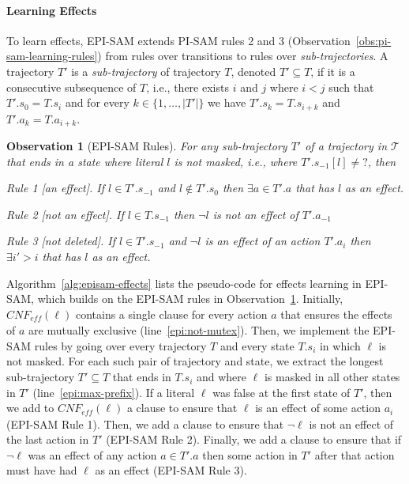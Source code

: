 \documentclass[letterpaper]{article} %
\newcommand{\eff}{\textit{eff}}
\newcommand{\cnf}{\textit{CNF}}
\newcommand{\true}{\textit{true}}
\newcommand{\unobserved}{\textit{?}}
\newtheorem{observation}[theorem]{Observation}
\begin{document}
\paragraph{Learning Effects}
To learn effects, EPI-SAM extends PI-SAM rules 2 and 3 (Observation~\ref{obs:pi-sam-learning-rules}) from rules over transitions to rules over \emph{sub-trajectories}.
A trajectory $T'$ is a \emph{sub-trajectory} of trajectory $T$, denoted $T'\subseteq T$, if it is a consecutive subsequence of $T$, i.e., there exists $i$ and $j$ where $i<j$ such that  $T'.s_0=T.s_i$
and for every $k\in \{1,\ldots,|T'|\}$ we have $T'.s_k=T.s_{i+k}$ and $T'.a_k=T.a_{i+k}$.

\begin{observation}[EPI-SAM Rules]
For any sub-trajectory $T'$ of a trajectory in $\mathcal{T}$ that ends in a state where literal $l$ is not masked, i.e., where $T'.s_{-1}[l]\neq\unobserved$, then
    \begin{compactitem}
        \item[Rule 1][an effect].
        If $l\in T'.s_{-1}$ and $l\notin T'.s_0$
        then $\exists a\in T'.a$ that has $l$ as an effect.
        \item[Rule 2][not an effect].
        If $l\in T.s_{-1}$ then $\neg l$ is not an effect of $T'.a_{-1}$
        \item[Rule 3][not deleted].%
        If $l\in T'.s_{-1}$ and $\neg l$ is an effect of an action $T'.a_i$ then $\exists i'>i$ that has $l$ as an effect.
    \end{compactitem}
\label{obs:epi-sam-learning-rules}
\end{observation}
Algorithm~\ref{alg:episam-effects} lists the pseudo-code for effects learning in EPI-SAM, which builds on the EPI-SAM rules in  Observation~\ref{obs:epi-sam-learning-rules}.
Initially, $\cnf_\eff(\ell)$ contains a single clause for every action $a$ that ensures the effects of $a$ are mutually exclusive (line~\ref{epi:not-mutex}).
Then, we implement the EPI-SAM rules by going over every trajectory $T$ and every state $T.s_i$ in which $\ell$ is not masked.
For each such pair of trajectory and state, we extract the longest sub-trajectory $T'\subseteq T$ that ends in $T.s_i$ and where $\ell$ is masked in all other states in $T'$ (line~\ref{epi:max-prefix}).
If a literal $\ell$ was false at the first state of $T'$, then we add to $\cnf_\eff(\ell)$ a clause to ensure that $\ell$ is an effect of some action $a_i$ (EPI-SAM Rule 1).
Then, we add a clause to ensure that $\neg\ell$ is not an effect of the last action in $T'$ (EPI-SAM Rule 2).
Finally, we add a clause to ensure that if $\neg \ell$ was an effect of any action $a\in T'.a$
then some action in $T'$ after that action must have had $\ell$ as an effect (EPI-SAM Rule 3).
\end{document}
